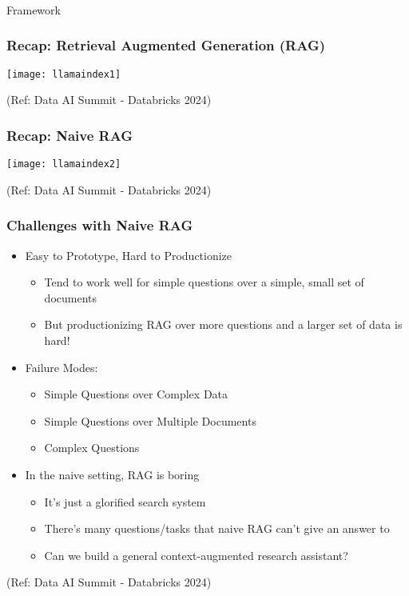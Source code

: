 \begin{frame}[fragile]\frametitle{}
\begin{center}
{\Large Framework}
\end{center}
\end{frame}

\begin{frame}[fragile]\frametitle{Recap: Retrieval Augmented Generation (RAG)}

\begin{center}
\texttt{[image: llamaindex1]}

{\tiny (Ref: Data AI Summit - Databricks 2024)}
\end{center}
\end{frame}

\begin{frame}[fragile]\frametitle{Recap: Naive RAG}

\begin{center}
\texttt{[image: llamaindex2]}

{\tiny (Ref: Data AI Summit - Databricks 2024)}
\end{center}
\end{frame}


\begin{frame}[fragile]\frametitle{Challenges with Naive RAG}


\begin{itemize}
\item Easy to Prototype, Hard to Productionize
	\begin{itemize}
	\item Tend to work well for simple questions over a simple, small set of documents
	\item But productionizing RAG over more questions and a larger set of data is hard!
	\end{itemize}	
\item Failure Modes:
	\begin{itemize}
	\item Simple Questions over Complex Data
	\item Simple Questions over Multiple Documents
	\item Complex Questions 
	\end{itemize}	
\item In the naive setting, RAG is boring
	\begin{itemize}
	\item It's just a glorified search system
	\item There's many questions/tasks that naive RAG can’t give an answer to
	\item Can we build a general context-augmented research assistant?
	\end{itemize}		
\end{itemize}	

{\tiny (Ref: Data AI Summit - Databricks 2024)}

\end{frame}

